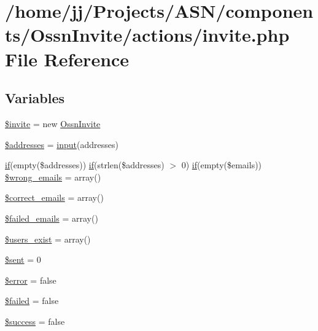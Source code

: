 \hypertarget{actions_2invite_8php}{}\section{/home/jj/\+Projects/\+A\+S\+N/components/\+Ossn\+Invite/actions/invite.php File Reference}
\label{actions_2invite_8php}
\subsection*{Variables}
\begin{DoxyCompactItemize}
\item 
\hyperlink{actions_2invite_8php_a63b1079dcf5a0f374b4b8100f9e49ae3}{\$invite} = new \hyperlink{class_ossn_invite}{Ossn\+Invite}
\item 
\hyperlink{actions_2invite_8php_a9fbeb6aeca916af4f45de53880787ef9}{\$addresses} = \hyperlink{ossn_8lib_8input_8php_a64ebee98b041c4f75f71ed3cd73cc8ed}{input}(\textquotesingle{}addresses\textquotesingle{})
\item 
\hyperlink{jquery_8tokeninput_8js_ad8dd46a3cbc004569e34401e9e71771a}{if}(empty(\$addresses)) \hyperlink{jquery_8tokeninput_8js_ad8dd46a3cbc004569e34401e9e71771a}{if}(strlen(\$addresses) $>$ 0) \hyperlink{jquery_8tokeninput_8js_ad8dd46a3cbc004569e34401e9e71771a}{if}(empty(\$emails)) \hyperlink{actions_2invite_8php_a0ba6bb4c55084a54da885773a3abb418}{\$wrong\+\_\+emails} = array()
\item 
\hyperlink{actions_2invite_8php_ad50fdb62ae2a9888161a9d8da46b7ee7}{\$correct\+\_\+emails} = array()
\item 
\hyperlink{actions_2invite_8php_a2faf6128f17333472f8ca59788771c2a}{\$failed\+\_\+emails} = array()
\item 
\hyperlink{actions_2invite_8php_ac2dd584e09b60032ab474d13e1f5816d}{\$users\+\_\+exist} = array()
\item 
\hyperlink{actions_2invite_8php_a429621079ef9c42d6c1022a4a8c75030}{\$sent} = 0
\item 
\hyperlink{actions_2invite_8php_aeba2ab722cedda53dbb7ec1a59f45550}{\$error} = false
\item 
\hyperlink{actions_2invite_8php_a145d4f1dd5e06d4d3d49ebc01751747a}{\$failed} = false
\item 
\hyperlink{actions_2invite_8php_a944564ee11ad329573548875b62a269e}{\$success} = false
\end{DoxyCompactItemize}


